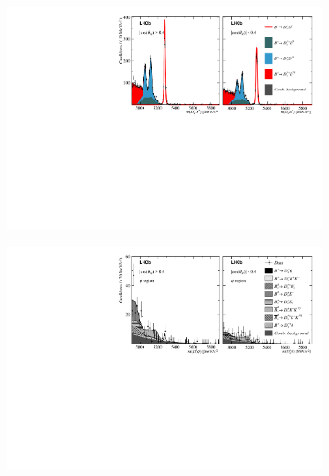 \begin{figure}[!h]
    \centering
    \begin{subfigure}[t]{1.0\textwidth}
        \centering
        \includegraphics[width=1.0\textwidth]{figs/Appendix_FitCategories/canvas_DsD0_Ds2KKPi_both_summed_splitHel_splitKKPi_s21_s21r1_s24_s26.pdf}\\
    \end{subfigure}
    \begin{subfigure}[t]{1.0\textwidth}
        \centering
        \includegraphics[width=1.0\textwidth]{figs/Appendix_FitCategories/canvas_DsPhi_Ds2KKPi_both_summed_splitHel_splitKKPi_s21_s21r1_s24_s26.pdf}\\

\end{subfigure}
\end{figure}
